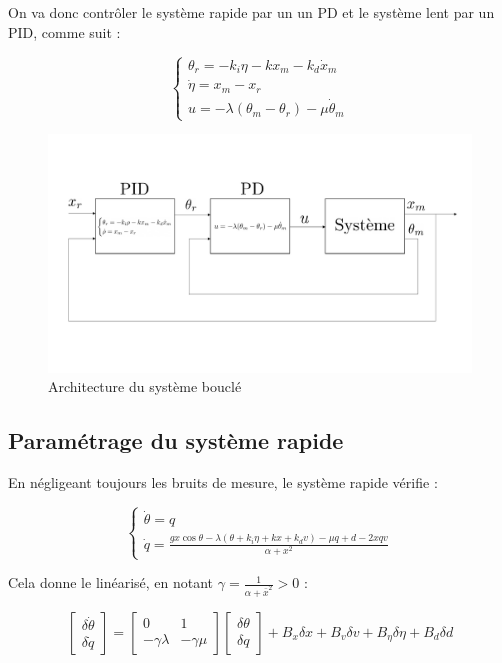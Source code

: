 \documentclass[10pt]{article}
\begin{document}
\noindent On va donc contrôler le système rapide par un un PD et le système lent par un PID, comme suit :

\[
	\begin{cases}
		\theta_r = - k_i \eta - k x_m - k_d \dot x_m \\
		\dot \eta = x_m - x_r \\
		u = - \lambda ( \theta_m - \theta_r ) - \mu \dot \theta_m
	\end{cases}
\]

\begin{figure}[H]
	\centering
	\includegraphics[width=\linewidth]{schemaPD+PID.pdf}
	\caption{Architecture du système bouclé}
\end{figure}

\subsection*{Paramétrage du système rapide}

\noindent En négligeant toujours les bruits de mesure, le système rapide vérifie :

\[
	\begin{cases}
		\dot \theta = q \\
		\dot q =
		\frac{gx \cos \theta - \lambda ( \theta + k_i \eta + k x + k_d v ) - \mu q + d - 2xqv}{\alpha + x^2}
	\end{cases}
\]

\noindent Cela donne le linéarisé, en notant $\gamma = \frac{1}{\alpha + \bar x^2} > 0$ :

\[
	\begin{bmatrix}
		\delta \dot \theta \\
		\delta \dot q
	\end{bmatrix}
	=\begin{bmatrix}
		0 & 1 \\
		- \gamma \lambda & - \gamma \mu
	\end{bmatrix}
	\begin{bmatrix}
		\delta \theta \\
		\delta q
	\end{bmatrix} +
	B_x \delta x +
	B_v \delta v +
	B_\eta \delta \eta +
	B_d \delta d
\]
\end{document}
